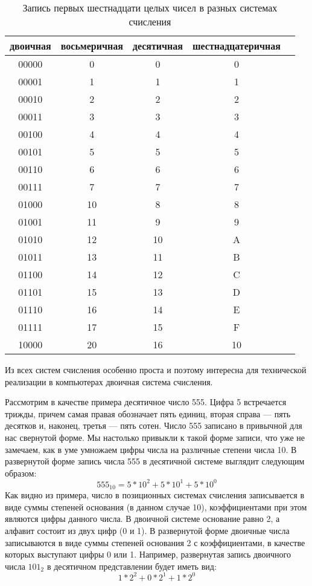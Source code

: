 \documentclass[a4paper]{article}
\begin{document}
\begin{table}\label{table:nums}
\caption{Запись первых шестнадцати целых чисел в разных системах счисления}
      \begin{center}
      \begin{tabular}{c * {4}{c}}
        \toprule
        двоичная & восьмеричная & десятичная & шестнадцатеричная \\
        \toprule
        00000 & 0 & 0 & 0 \\
        00001 & 1 & 1 & 1 \\
        00010 & 2 & 2 & 2 \\
        00011 & 3 & 3 & 3 \\
        00100 & 4 & 4 & 4 \\
        00101 & 5 & 5 & 5 \\
        00110 & 6 & 6 & 6 \\
        00111 & 7 & 7 & 7 \\
        01000 & 10 & 8 & 8 \\
        01001 & 11 & 9 & 9 \\
        01010 & 12 & 10 & A \\
        01011 & 13 & 11 & B \\
        01100 & 14 & 12 & C \\
        01101 & 15 & 13 & D \\
        01110 & 16 & 14 & E \\
        01111 & 17 & 15 & F \\
        10000 & 20 & 16 & 10 \\
        \bottomrule
      \end{tabular}
      \end{center}
    \end{table}
                                  
Из всех систем счисления особенно проста и поэтому интересна для технической реализации в компьютерах двоичная система счисления.

Рассмотрим в качестве примера десятичное число 555. Цифра 5 встречается трижды, причем самая правая обозначает пять единиц, вторая справа — пять десятков и, наконец, третья — пять сотен. Число 555 записано в привычной для нас свернутой форме. Мы настолько привыкли к такой форме записи, что уже не замечаем, как в уме умножаем цифры числа на различные степени числа 10. В развернутой форме запись числа 555 в десятичной системе выглядит следующим образом:
$$555_{10} = 5 * 10^{2} + 5 * 10^{1} + 5 * 10^{0}$$
Как видно из примера, число в позиционных системах счисления записывается в виде суммы степеней основания (в данном случае 10), коэффициентами при этом являются цифры данного числа. В двоичной системе основание равно 2, а алфавит состоит из двух цифр (0 и 1). В развернутой форме двоичные числа записываются в виде суммы степеней основания 2 с коэффициентами, в качестве которых выступают цифры 0 или 1. Например, развернутая запись двоичного числа $101_{2}$ в десятичном представлении будет иметь вид:
$$1 * 2^{2} + 0 * 2^{1} + 1 * 2^{0}$$
\end{document}
